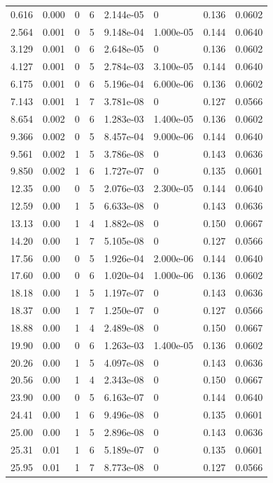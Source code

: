 \documentclass[preview]{standalone}
\begin{document}
{{\begin{tabular}{L{1.2cm}C{1.2cm} C{0.3cm}C{0.5cm} C{1.4cm}C{1.4cm} C{1.4cm}C{1.4cm}}
  0.616  &  0.000  & 0     &  6 &  2.144e-05  & 0  & 0.136 &  0.0602   \\ 
  2.564  &  0.001  & 0     &  5 &  9.148e-04  & 1.000e-05  & 0.144 &  0.0640   \\ 
  3.129  &  0.001  & 0     &  6 &  2.648e-05  & 0  & 0.136 &  0.0602   \\ 
  4.127  &  0.001  & 0     &  5 &  2.784e-03  & 3.100e-05  & 0.144 &  0.0640   \\ 
  6.175  &  0.001  & 0     &  6 &  5.196e-04  & 6.000e-06  & 0.136 &  0.0602   \\ 
  7.143  &  0.001  & 1     &  7 &  3.781e-08  & 0  & 0.127 &  0.0566   \\ 
  8.654  &  0.002  & 0     &  6 &  1.283e-03  & 1.400e-05  & 0.136 &  0.0602   \\ 
  9.366  &  0.002  & 0     &  5 &  8.457e-04  & 9.000e-06  & 0.144 &  0.0640   \\ 
  9.561  &  0.002  & 1     &  5 &  3.786e-08  & 0  & 0.143 &  0.0636   \\ 
  9.850  &  0.002  & 1     &  6 &  1.727e-07  & 0  & 0.135 &  0.0601   \\ 
  12.35  &  0.00  & 0     &  5 &  2.076e-03  & 2.300e-05  & 0.144 &  0.0640   \\ 
  12.59  &  0.00  & 1     &  5 &  6.633e-08  & 0  & 0.143 &  0.0636   \\ 
  13.13  &  0.00  & 1     &  4 &  1.882e-08  & 0  & 0.150 &  0.0667   \\ 
  14.20  &  0.00  & 1     &  7 &  5.105e-08  & 0  & 0.127 &  0.0566   \\ 
  17.56  &  0.00  & 0     &  5 &  1.926e-04  & 2.000e-06  & 0.144 &  0.0640   \\ 
  17.60  &  0.00  & 0     &  6 &  1.020e-04  & 1.000e-06  & 0.136 &  0.0602   \\ 
  18.18  &  0.00  & 1     &  5 &  1.197e-07  & 0  & 0.143 &  0.0636   \\ 
  18.37  &  0.00  & 1     &  7 &  1.250e-07  & 0  & 0.127 &  0.0566   \\ 
  18.88  &  0.00  & 1     &  4 &  2.489e-08  & 0  & 0.150 &  0.0667   \\ 
  19.90  &  0.00  & 0     &  6 &  1.263e-03  & 1.400e-05  & 0.136 &  0.0602   \\ 
  20.26  &  0.00  & 1     &  5 &  4.097e-08  & 0  & 0.143 &  0.0636   \\ 
  20.56  &  0.00  & 1     &  4 &  2.343e-08  & 0  & 0.150 &  0.0667   \\ 
  23.90  &  0.00  & 0     &  5 &  6.163e-07  & 0  & 0.144 &  0.0640   \\ 
  24.41  &  0.00  & 1     &  6 &  9.496e-08  & 0  & 0.135 &  0.0601   \\ 
  25.00  &  0.00  & 1     &  5 &  2.896e-08  & 0  & 0.143 &  0.0636   \\ 
  25.31  &  0.01  & 1     &  6 &  5.189e-07  & 0  & 0.135 &  0.0601   \\ 
  25.95  &  0.01  & 1     &  7 &  8.773e-08  & 0  & 0.127 &  0.0566   \\ 
\hline 
\end{tabular} 

}}
\end{document}
